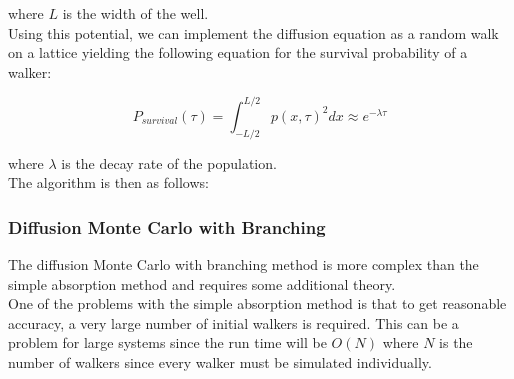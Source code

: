 \documentclass[reqno]{amsart}
\numberwithin{equation}{section}
\numberwithin{figure}{section}
\begin{document}
where $L$ is the width of the well. \\

Using this potential, we can implement the diffusion equation as a random walk on a lattice yielding the following equation for the survival probability of a walker:

\begin{equation}
    P_{survival}(\tau) = \int_{-L/2}^{L/2} p(x, \tau)^2 dx \approx e^{-\lambda \tau}
\end{equation}

where $\lambda$ is the decay rate of the population. \\

The algorithm is then as follows:



\subsubsection{Diffusion Monte Carlo with Branching}

The diffusion Monte Carlo with branching method is more complex than the simple absorption method and requires some additional theory. \\

One of the problems with the simple absorption method is that to get reasonable accuracy, a very large number of initial walkers is required. This can be a problem for large systems since the run time will be $O(N)$ where $N$ is the number of walkers since every walker must be simulated individually. \\
\end{document}
